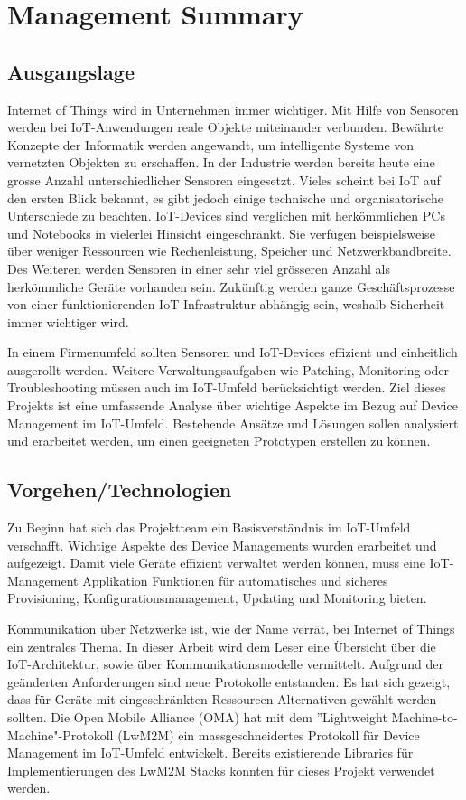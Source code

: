 \chapter*{Management Summary}
\section*{Ausgangslage}
Internet of Things wird in Unternehmen immer wichtiger. Mit Hilfe von Sensoren werden bei IoT-Anwendungen reale Objekte miteinander verbunden. Bewährte Konzepte der Informatik werden angewandt, um intelligente Systeme von vernetzten Objekten zu erschaffen. In der Industrie werden bereits heute eine grosse Anzahl unterschiedlicher Sensoren eingesetzt. Vieles scheint bei IoT auf den ersten Blick bekannt, es gibt jedoch einige technische und organisatorische Unterschiede zu beachten. IoT-Devices sind verglichen mit herkömmlichen PCs und Notebooks in vielerlei Hinsicht eingeschränkt. Sie verfügen beispielsweise über weniger Ressourcen wie Rechenleistung, Speicher und Netzwerkbandbreite. Des Weiteren werden Sensoren in einer sehr viel grösseren Anzahl als herkömmliche Geräte vorhanden sein. Zukünftig werden ganze Geschäftsprozesse von einer funktionierenden IoT-Infrastruktur abhängig sein, weshalb Sicherheit immer wichtiger wird.

In einem Firmenumfeld sollten Sensoren und IoT-Devices effizient und einheitlich ausgerollt werden. Weitere Verwaltungsaufgaben wie Patching, Monitoring oder Troubleshooting müssen auch im IoT-Umfeld berücksichtigt werden. Ziel dieses Projekts ist eine umfassende Analyse über wichtige Aspekte im Bezug auf Device Management im IoT-Umfeld. Bestehende Ansätze und Lösungen sollen analysiert und erarbeitet werden, um einen geeigneten Prototypen erstellen zu können. 
\section*{Vorgehen/Technologien}
Zu Beginn hat sich das Projektteam ein Basisverständnis im IoT-Umfeld verschafft. Wichtige Aspekte des Device Managements wurden erarbeitet und aufgezeigt. Damit viele Geräte effizient verwaltet werden können, muss eine IoT-Management Applikation Funktionen für automatisches und sicheres Provisioning, Konfigurationsmanagement, Updating und Monitoring bieten. 

Kommunikation über Netzwerke ist, wie der Name verrät, bei Internet of Things ein zentrales Thema. In dieser Arbeit wird dem Leser eine Übersicht über die IoT-Architektur, sowie über Kommunikationsmodelle vermittelt. Aufgrund der geänderten Anforderungen sind neue Protokolle entstanden. Es hat sich gezeigt, dass für Geräte mit eingeschränkten Ressourcen Alternativen gewählt werden sollten. Die Open Mobile Alliance (OMA) hat mit dem ''Lightweight Machine-to-Machine"-Protokoll (LwM2M) ein massgeschneidertes Protokoll für Device Management im IoT-Umfeld entwickelt. Bereits existierende Libraries für Implementierungen des LwM2M Stacks konnten für dieses Projekt verwendet werden.

